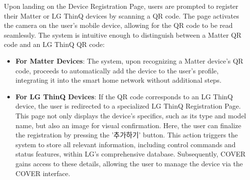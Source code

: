 \documentclass[conference]{IEEEtran}
\begin{document}
\begin{enumerate}[label=\arabic*.]
\begin{enumerate}[label=\alph*.]
Upon landing on the Device Registration Page, users are prompted to register their Matter or LG ThinQ devices by scanning a QR code. The page activates the camera on the user's mobile device, allowing for the QR code to be read seamlessly. The system is intuitive enough to distinguish between a Matter QR code and an LG ThinQ QR code:\\
\begin{itemize}
\item \textbf{For Matter Devices}: The system, upon recognizing a Matter device's QR code, proceeds to automatically add the device to the user’s profile, integrating it into the smart home network without additional steps.\\
\item \textbf{For LG ThinQ Devices}: If the QR code corresponds to an LG ThinQ device, the user is redirected to a specialized LG ThinQ Registration Page. This page not only displays the device's specifics, such as its type and model name, but also an image for visual confirmation. Here, the user can finalize the registration by pressing the '추가하기' button. This action triggers the system to store all relevant information, including control commands and status features, within LG's comprehensive database. Subsequently, COVER gains access to these details, allowing the user to manage the device via the COVER interface.\\

\end{itemize}
\end{enumerate}
\end{enumerate}
\end{document}
